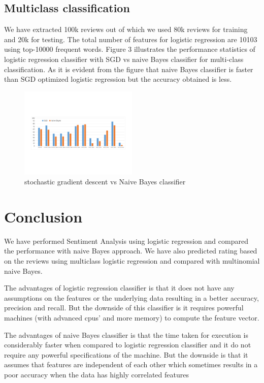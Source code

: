 \documentclass{article}
\begin{document}
\subsection{Multiclass classification}
We have extracted 100k reviews out of which we used 80k reviews for training and 20k for testing. The total number of features for logistic regression are 10103 using top-10000 frequent words. Figure 3 illustrates the performance statistics of logistic regression classifier with SGD vs naive Bayes classifier for multi-class classification.  As it is evident from the figure that naive Bayes classifier is faster than SGD optimized logistic regression but the accuracy obtained is less.

\begin{figure}[H]
  \caption{stochastic gradient descent vs Naive Bayes classifier}
  \centering
    \includegraphics[width=0.5\textwidth]{cropped_Book2}
\end{figure}




\section{Conclusion}
We have performed Sentiment Analysis using logistic regression and compared the performance with naive Bayes approach. We have also predicted rating based on the reviews using multiclass logistic regression and compared with multinomial naive Bayes.


The advantages of logistic regression classifier is that it does not have any assumptions on the features or the underlying data resulting in a better accuracy, precision and recall. But the downside of this classifier is it requires powerful machines (with advanced cpus’ and more memory) to compute the feature vector.


The advantages of naive Bayes classifier is that the time taken for execution is considerably faster when compared to logistic regression classifier and it do not require any powerful  specifications of the machine. But the downside is that it assumes that features are independent of each other which sometimes results in a poor accuracy when the data has highly correlated features
\end{document}
